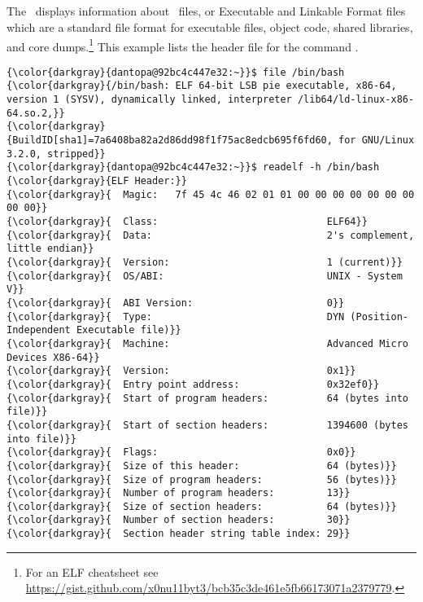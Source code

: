 % 

\subsection{\readelf}
\label{sec:readelf}
The  \ displays information about \elf \ files, or Executable and Linkable Format files which are a standard file format for executable files, object code, shared libraries, and core dumps.\footnote{For an ELF cheatsheet see \href{https://gist.github.com/x0nu11byt3/bcb35c3de461e5fb66173071a2379779}{https://gist.github.com/x0nu11byt3/bcb35c3de461e5fb66173071a2379779}.} This example lists the header file for the command .
{\footnotesize{
\begin{Verbatim}[commandchars=\\\{\}]
{\color{darkgray}{dantopa@92bc4c447e32:~}}$ file /bin/bash
{\color{darkgray}{/bin/bash: ELF 64-bit LSB pie executable, x86-64, version 1 (SYSV), dynamically linked, interpreter /lib64/ld-linux-x86-64.so.2,}} 
{\color{darkgray}{BuildID[sha1]=7a6408ba82a2d86dd98f1f75ac8edcb695f6fd60, for GNU/Linux 3.2.0, stripped}}
{\color{darkgray}{dantopa@92bc4c447e32:~}}$ readelf -h /bin/bash
{\color{darkgray}{ELF Header:}}
{\color{darkgray}{  Magic:   7f 45 4c 46 02 01 01 00 00 00 00 00 00 00 00 00}} 
{\color{darkgray}{  Class:                             ELF64}}
{\color{darkgray}{  Data:                              2's complement, little endian}}
{\color{darkgray}{  Version:                           1 (current)}}
{\color{darkgray}{  OS/ABI:                            UNIX - System V}}
{\color{darkgray}{  ABI Version:                       0}}
{\color{darkgray}{  Type:                              DYN (Position-Independent Executable file)}}
{\color{darkgray}{  Machine:                           Advanced Micro Devices X86-64}}
{\color{darkgray}{  Version:                           0x1}}
{\color{darkgray}{  Entry point address:               0x32ef0}}
{\color{darkgray}{  Start of program headers:          64 (bytes into file)}}
{\color{darkgray}{  Start of section headers:          1394600 (bytes into file)}}
{\color{darkgray}{  Flags:                             0x0}}
{\color{darkgray}{  Size of this header:               64 (bytes)}}
{\color{darkgray}{  Size of program headers:           56 (bytes)}}
{\color{darkgray}{  Number of program headers:         13}}
{\color{darkgray}{  Size of section headers:           64 (bytes)}}
{\color{darkgray}{  Number of section headers:         30}}
{\color{darkgray}{  Section header string table index: 29}}
\end{Verbatim}
}}

\endinput  %
